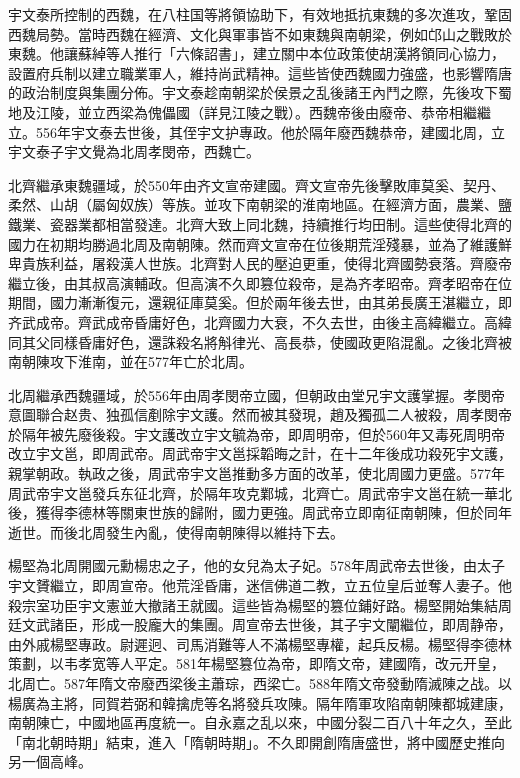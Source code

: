 宇文泰所控制的西魏，在八柱国等將領協助下，有效地抵抗東魏的多次進攻，鞏固西魏局勢。當時西魏在經濟、文化與軍事皆不如東魏與南朝梁，例如邙山之戰敗於東魏。他讓蘇綽等人推行「六條詔書」，建立關中本位政策使胡漢將領同心協力，設置府兵制以建立職業軍人，維持尚武精神。這些皆使西魏國力強盛，也影響隋唐的政治制度與集團分佈。宇文泰趁南朝梁於侯景之乱後諸王內鬥之際，先後攻下蜀地及江陵，並立西梁為傀儡國（詳見江陵之戰）。西魏帝後由廢帝、恭帝相繼繼立。556年宇文泰去世後，其侄宇文护專政。他於隔年廢西魏恭帝，建國北周，立宇文泰子宇文覺為北周孝閔帝，西魏亡。

北齊繼承東魏疆域，於550年由齐文宣帝建國。齊文宣帝先後擊敗庫莫奚、契丹、柔然、山胡（屬匈奴族）等族。並攻下南朝梁的淮南地區。在經濟方面，農業、鹽鐵業、瓷器業都相當發達。北齊大致上同北魏，持續推行均田制。這些使得北齊的國力在初期均勝過北周及南朝陳。然而齊文宣帝在位後期荒淫殘暴，並為了維護鮮卑貴族利益，屠殺漢人世族。北齊對人民的壓迫更重，使得北齊國勢衰落。齊廢帝繼立後，由其叔高演輔政。但高演不久即篡位殺帝，是為齐孝昭帝。齊孝昭帝在位期間，國力漸漸復元，還親征庫莫奚。但於兩年後去世，由其弟長廣王湛繼立，即齐武成帝。齊武成帝昏庸好色，北齊國力大衰，不久去世，由後主高緯繼立。高緯同其父同樣昏庸好色，還誅殺名將斛律光、高長恭，使國政更陷混亂。之後北齊被南朝陳攻下淮南，並在577年亡於北周。

北周繼承西魏疆域，於556年由周孝閔帝立國，但朝政由堂兄宇文護掌握。孝閔帝意圖聯合赵贵、独孤信剷除宇文護。然而被其發現，趙及獨孤二人被殺，周孝閔帝於隔年被先廢後殺。宇文護改立宇文毓為帝，即周明帝，但於560年又毒死周明帝改立宇文邕，即周武帝。周武帝宇文邕採韜晦之計，在十二年後成功殺死宇文護，親掌朝政。執政之後，周武帝宇文邕推動多方面的改革，使北周國力更盛。577年周武帝宇文邕發兵东征北齊，於隔年攻克鄴城，北齊亡。周武帝宇文邕在統一華北後，獲得李德林等關東世族的歸附，國力更強。周武帝立即南征南朝陳，但於同年逝世。而後北周發生內亂，使得南朝陳得以維持下去。

楊堅為北周開國元勳楊忠之子，他的女兒為太子妃。578年周武帝去世後，由太子宇文贇繼立，即周宣帝。他荒淫昏庸，迷信佛道二教，立五位皇后並奪人妻子。他殺宗室功臣宇文憲並大撤諸王就國。這些皆為楊堅的篡位鋪好路。楊堅開始集結周廷文武諸臣，形成一股龐大的集團。周宣帝去世後，其子宇文闡繼位，即周静帝，由外戚楊堅專政。尉遲迥、司馬消難等人不滿楊堅專權，起兵反楊。楊堅得李德林策劃，以韦孝宽等人平定。581年楊堅篡位為帝，即隋文帝，建國隋，改元开皇，北周亡。587年隋文帝廢西梁後主蕭琮，西梁亡。588年隋文帝發動隋滅陳之战。以楊廣為主將，同賀若弼和韓擒虎等名將發兵攻陳。隔年隋軍攻陷南朝陳都城建康，南朝陳亡，中國地區再度統一。自永嘉之乱以來，中國分裂二百八十年之久，至此「南北朝時期」結束，進入「隋朝時期」。不久即開創隋唐盛世，將中國歷史推向另一個高峰。

